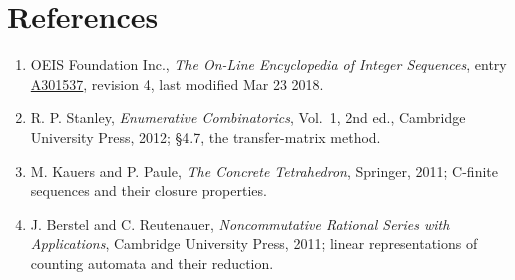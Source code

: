 \documentclass[11pt]{article}
\theoremstyle{definition}
\begin{document}
\section{References}

\begin{enumerate}

\item OEIS Foundation Inc., \emph{The On-Line Encyclopedia of Integer Sequences}, entry \href{https://oeis.org/A301537}{A301537}, revision 4, last modified Mar 23 2018.

\item R. P. Stanley, \emph{Enumerative Combinatorics}, Vol.~1, 2nd ed., Cambridge University Press, 2012; \S4.7, the transfer-matrix method.

\item M. Kauers and P. Paule, \emph{The Concrete Tetrahedron}, Springer, 2011; C-finite sequences and their closure properties.

\item J. Berstel and C. Reutenauer, \emph{Noncommutative Rational Series with Applications}, Cambridge University Press, 2011; linear representations of counting automata and their reduction.

\end{enumerate}
\end{document}
